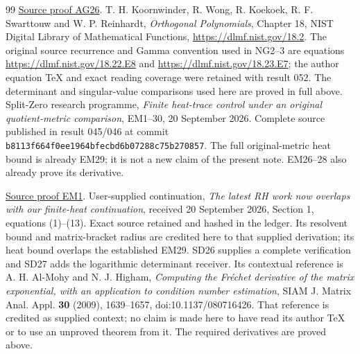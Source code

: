 \documentclass[11pt]{article}
\begin{document}
\begin{thebibliography}{99}
\href{https://github.com/KokunoYumeto/zeta-function-research-reader/blob/5992ad50c0f2a06921f1fcaded7b4e38097c0739/workbenches/splitzero-tandem/continuations/20260920-original-kernel-mixed-determinants/providers/ABSOLUTE_GAMMA_AND_ACTION.tex\#L358}{Source proof AG26}.
 T. H. Koornwinder, R. Wong, R. Koekoek,
R. F. Swarttouw and W. P. Reinhardt, \emph{Orthogonal Polynomials},
Chapter 18, NIST Digital Library of Mathematical Functions,
\url{https://dlmf.nist.gov/18.2}. The original source recurrence and
Gamma convention used in NG2--3 are equations
\url{https://dlmf.nist.gov/18.22.E8} and
\url{https://dlmf.nist.gov/18.23.E7}; the author equation TeX and exact
reading coverage were retained with result 052. The determinant and
singular-value comparisons used here are proved in full above.
 Split-Zero research programme, \emph{Finite heat-trace
control under an original quotient-metric comparison}, EM1--30,
20 September 2026. Complete source published in result 045/046 at
commit \nolinkurl{b8113f664f0ee1964bfecbd6b07288c75b270857}.
The full original-metric heat bound is already EM29; it is not a new
claim of the present note. EM26--28 also already prove its derivative.

\href{https://github.com/KokunoYumeto/zeta-function-research-reader/blob/5992ad50c0f2a06921f1fcaded7b4e38097c0739/workbenches/splitzero-tandem/continuations/20260920-original-kernel-mixed-determinants/providers/ENDPOINT_METRIC_HEAT.tex\#L38}{Source proof EM1}.
 User-supplied continuation, \emph{The latest RH
work now overlaps with our finite-heat continuation}, received
20 September 2026, Section 1, equations (1)--(13). Exact source retained
and hashed in the ledger. Its resolvent bound and matrix-bracket radius
are credited here to that supplied derivation; its heat bound overlaps
the established EM29. SD26 supplies a complete verification and SD27 adds the logarithmic
determinant receiver. Its contextual reference is A. H. Al-Mohy and
N. J. Higham, \emph{Computing the Fr\'echet derivative of the matrix
exponential, with an application to condition number estimation},
SIAM J. Matrix Anal. Appl. \textbf{30} (2009), 1639--1657,
doi:10.1137/080716426. That reference is credited as supplied context;
no claim is made here to have read its author TeX or to use an unproved
theorem from it. The required derivatives are proved above.



\end{thebibliography}
\end{document}
